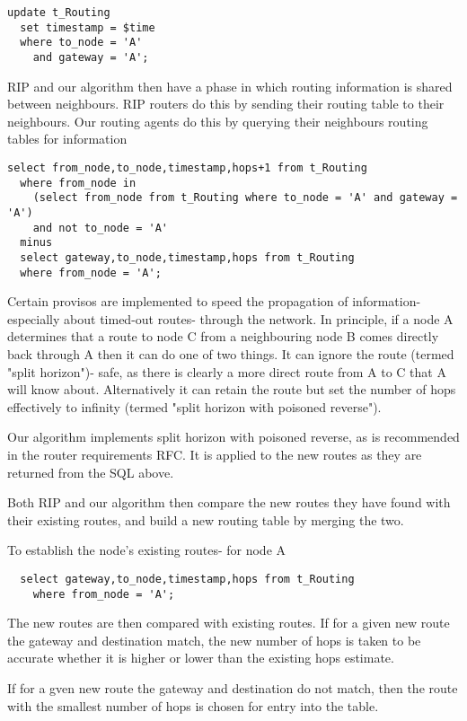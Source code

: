 \documentclass{cmspaper}
\begin{document}
{\small\begin{verbatim}
update t_Routing
  set timestamp = $time
  where to_node = 'A'
    and gateway = 'A';
\end{verbatim}}

RIP and our algorithm then have a phase in which routing information is shared between neighbours. RIP routers do this by sending their routing table to their neighbours. Our routing agents do this by querying their neighbours routing tables for information

{\small\begin{verbatim}
select from_node,to_node,timestamp,hops+1 from t_Routing
  where from_node in 
    (select from_node from t_Routing where to_node = 'A' and gateway = 'A')
    and not to_node = 'A'
  minus
  select gateway,to_node,timestamp,hops from t_Routing
  where from_node = 'A';
\end{verbatim}}

Certain provisos are implemented to speed the propagation of information- especially about timed-out routes- through the network. In principle, if a node A determines that a route to node C from a neighbouring node B comes directly back through A then it can do one of two things. It can ignore the route (termed "split horizon")- safe, as there is clearly a more direct route from A to C that A will know about. Alternatively it can retain the route but set the number of hops effectively to infinity (termed "split horizon with poisoned reverse").

Our algorithm implements split horizon with poisoned reverse, as is recommended in the router requirements RFC. It is applied to the new routes as they are returned from the SQL above.

Both RIP and our algorithm then compare the new routes they have found with their existing routes, and build a new routing table by merging the two.

To establish the node's existing routes- for node A

{\small\begin{verbatim}
  select gateway,to_node,timestamp,hops from t_Routing
    where from_node = 'A';
\end{verbatim}}

The new routes are then compared with existing routes. If for a given new route the gateway and destination match, the new number of hops is taken to be accurate whether it is higher or lower than the existing hops estimate.

If for a gven new route the gateway and destination do not match, then the route with the smallest number of hops is chosen for entry into the table.
\end{document}
